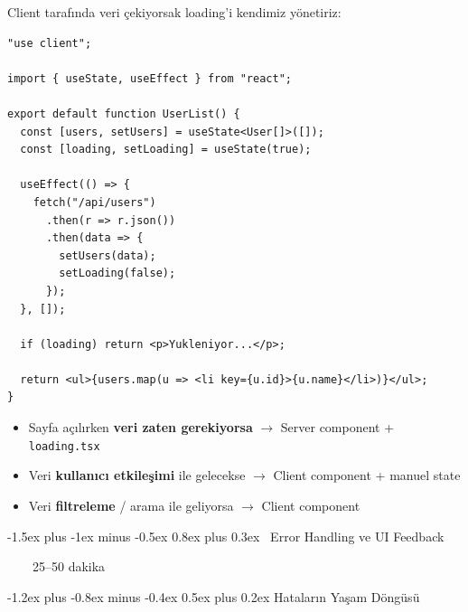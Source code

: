 \documentclass[12pt, a4paper]{article}
\makeatletter
\renewcommand{\section}{%
  \@startsection{section}{1}{\z@}%
    {-1.5ex plus -1ex minus -0.5ex}%
    {0.8ex plus 0.3ex}%
    {\normalfont\Large\bfseries\sffamily\color{primary}}%
}
\renewcommand{\subsection}{%
  \@startsection{subsection}{2}{\z@}%
    {-1.2ex plus -0.8ex minus -0.4ex}%
    {0.5ex plus 0.2ex}%
    {\normalfont\large\bfseries\sffamily\color{secondary}}%
}
\newcommand{\timebadge}[1]{%
  \noindent
  \colorbox{primary}{\color{white}\sffamily\bfseries\small\strut~~\faStopwatch~~#1~~}%
  \par\vspace{4pt}%
}
\makeatother
\begin{document}
Client tarafında veri çekiyorsak loading'i kendimiz yönetiriz:

\begin{tcolorbox}[enhanced, colback=codebg, colframe=gray!30,
    colbacktitle=clientcol!85!black, coltitle=white, arc=4pt,
    title={\sffamily\bfseries\small Client'ta Loading}]
\begin{lstlisting}[style=jsxstyle]
"use client";

import { useState, useEffect } from "react";

export default function UserList() {
  const [users, setUsers] = useState<User[]>([]);
  const [loading, setLoading] = useState(true);

  useEffect(() => {
    fetch("/api/users")
      .then(r => r.json())
      .then(data => {
        setUsers(data);
        setLoading(false);
      });
  }, []);

  if (loading) return <p>Yukleniyor...</p>;

  return <ul>{users.map(u => <li key={u.id}>{u.name}</li>)}</ul>;
}
\end{lstlisting}
\end{tcolorbox}

\vspace{6pt}

\begin{infobox}
\begin{itemize}
  \item Sayfa açılırken \textbf{veri zaten gerekiyorsa} $\rightarrow$ Server component + \texttt{loading.tsx}
  \item Veri \textbf{kullanıcı etkileşimi} ile gelecekse $\rightarrow$ Client component + manuel state
  \item Veri \textbf{filtreleme} / arama ile geliyorsa $\rightarrow$ Client component
\end{itemize}
\end{infobox}

\newpage
\section{\faExclamationTriangle\ Error Handling ve UI Feedback}
\timebadge{25--50 dakika}

\subsection{Hataların Yaşam Döngüsü}
\end{document}
